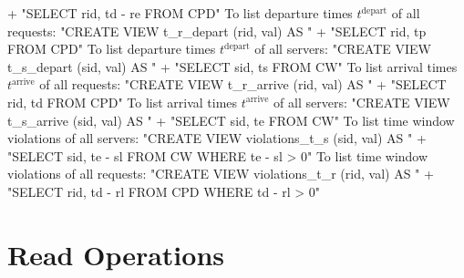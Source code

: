   + "SELECT rid, td - re FROM CPD"
\nwendcode{}\nwdocspar
To list departure times $t^\textrm{depart}$ of all requests:
\nwenddocs{}\endmoddef{}
"CREATE VIEW t_r_depart (rid, val) AS "
  + "SELECT rid, tp FROM CPD"
\nwendcode{}\nwdocspar
To list departure times $t^\textrm{depart}$ of all servers:
\nwenddocs{}\endmoddef{}
"CREATE VIEW t_s_depart (sid, val) AS "
  + "SELECT sid, ts FROM CW"
\nwendcode{}\nwdocspar
To list arrival times $t^\textrm{arrive}$ of all requests:
\nwenddocs{}\endmoddef{}
"CREATE VIEW t_r_arrive (rid, val) AS "
  + "SELECT rid, td FROM CPD"
\nwendcode{}\nwdocspar
To list arrival times $t^\textrm{arrive}$ of all servers:
\nwenddocs{}\endmoddef{}
"CREATE VIEW t_s_arrive (sid, val) AS "
  + "SELECT sid, te FROM CW"
\nwendcode{}\nwdocspar
To list time window violations of all servers:
\nwenddocs{}\endmoddef{}
"CREATE VIEW violations_t_s (sid, val) AS "
  + "SELECT sid, te - sl FROM CW WHERE te - sl > 0"
\nwendcode{}\nwdocspar
To list time window violations of all requests:
\nwenddocs{}\endmoddef{}
"CREATE VIEW violations_t_r (rid, val) AS "
  + "SELECT rid, td - rl FROM CPD WHERE td - rl > 0"
\nwendcode{}\nwdocspar
\nwenddocs{}\chapter{Read Operations}
\label{read}

